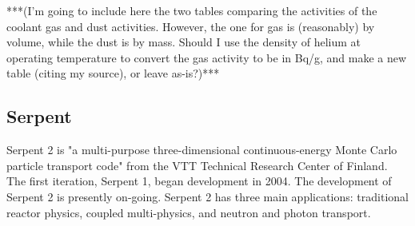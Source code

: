 ***(I'm going to include here the two tables comparing the activities of the coolant gas and dust activities.  However, the one for gas is (reasonably) by volume, while the dust is by mass.  Should I use the density of helium at operating temperature to convert the gas activity to be in Bq/g, and make a new table (citing my source), or leave as-is?)***





\subsection{Serpent}
Serpent 2 is "a multi-purpose three-dimensional continuous-energy Monte Carlo particle transport code" \cite{noauthor_serpent_nodate} from the VTT Technical Research Center of Finland.  The first iteration, Serpent 1, began development in 2004.  The development of Serpent 2 is presently on-going.  Serpent 2 has three main applications: traditional reactor physics, coupled multi-physics, and neutron and photon transport.  